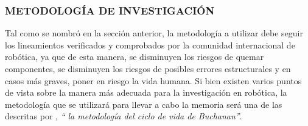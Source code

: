 \subsubsection{METODOLOGÍA DE INVESTIGACIÓN}
Tal como se nombró en la sección anterior, la metodología a utilizar debe seguir los lineamientos verificados y comprobados por la comunidad internacional de robótica, ya que de esta manera, se disminuyen los riesgos de quemar componentes, se disminuyen los riesgos de posibles errores estructurales y en casos más graves, poner en riesgo la vida humana. Si bien existen varios puntos de vista sobre la manera más adecuada para la investigación en robótica, la metodología que se utilizará para llevar a cabo la memoria será una de las descritas por \cite{inves_2004}, \textit{`` la metodología del ciclo de vida de Buchanan''}.

